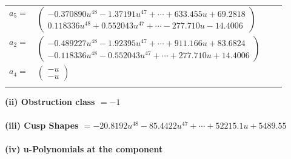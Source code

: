 \documentclass[1p]{elsarticle_modified}
\theoremstyle{definition}
\begin{document}
\begin{tabular}{m{7pt} m{180pt} m{7pt} m{180pt} }
\flushright $a_{5}=$&$\begin{pmatrix}-0.370890 u^{48}-1.37191 u^{47}+\cdots+633.455 u+69.2818\\0.118336 u^{48}+0.552043 u^{47}+\cdots-277.710 u-14.4006\end{pmatrix}$ \\
\flushright $a_{2}=$&$\begin{pmatrix}-0.489227 u^{48}-1.92395 u^{47}+\cdots+911.166 u+83.6824\\-0.118336 u^{48}-0.552043 u^{47}+\cdots+277.710 u+14.4006\end{pmatrix}$ \\
\flushright $a_{4}=$&$\begin{pmatrix}- u\\- u\end{pmatrix}$\\&\end{tabular}
\flushleft \textbf{(ii) Obstruction class $= -1$}\\~\\
\flushleft \textbf{(iii) Cusp Shapes $= -20.8192 u^{48}-85.4422 u^{47}+\cdots+52215.1 u+5489.55$}\\~\\
\newpage\renewcommand{\arraystretch}{1}
\flushleft \textbf{(iv) u-Polynomials at the component}\newline \\
\end{document}

